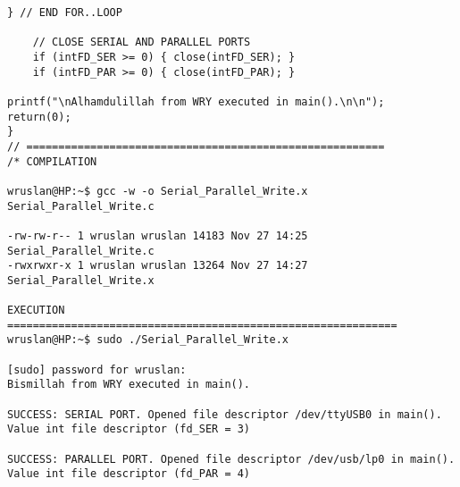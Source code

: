 \begin{lstlisting}[caption={App4-Concurrent Writes to Parallel and Serial Ports}, label=App4-Concurrent Writes to Parallel and Serial Ports]
	} // END FOR..LOOP

	// CLOSE SERIAL AND PARALLEL PORTS
	if (intFD_SER >= 0) { close(intFD_SER); }
	if (intFD_PAR >= 0) { close(intFD_PAR); }

printf("\nAlhamdulillah from WRY executed in main().\n\n");
return(0);
}
// ========================================================
/* COMPILATION 

wruslan@HP:~$ gcc -w -o Serial_Parallel_Write.x Serial_Parallel_Write.c 

-rw-rw-r-- 1 wruslan wruslan 14183 Nov 27 14:25 Serial_Parallel_Write.c
-rwxrwxr-x 1 wruslan wruslan 13264 Nov 27 14:27 Serial_Parallel_Write.x

EXECUTION
=============================================================
wruslan@HP:~$ sudo ./Serial_Parallel_Write.x 

[sudo] password for wruslan: 
Bismillah from WRY executed in main().

SUCCESS: SERIAL PORT. Opened file descriptor /dev/ttyUSB0 in main().
Value int file descriptor (fd_SER = 3) 

SUCCESS: PARALLEL PORT. Opened file descriptor /dev/usb/lp0 in main().
Value int file descriptor (fd_PAR = 4) 


\end{lstlisting}

